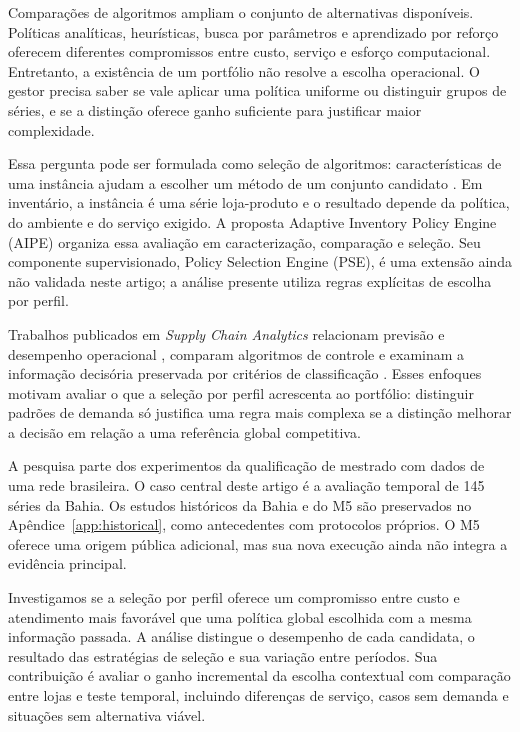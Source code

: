 \documentclass[preprint,12pt]{elsarticle}
\begin{document}
Comparações de algoritmos ampliam o conjunto de alternativas disponíveis. Políticas analíticas, heurísticas, busca por parâmetros e aprendizado por reforço oferecem diferentes compromissos entre custo, serviço e esforço computacional. Entretanto, a existência de um portfólio não resolve a escolha operacional. O gestor precisa saber se vale aplicar uma política uniforme ou distinguir grupos de séries, e se a distinção oferece ganho suficiente para justificar maior complexidade.

Essa pergunta pode ser formulada como seleção de algoritmos: características de uma instância ajudam a escolher um método de um conjunto candidato \cite{rice1976,Kotthoff2014AlgorithmSelection}. Em inventário, a instância é uma série loja-produto e o resultado depende da política, do ambiente e do serviço exigido. A proposta Adaptive Inventory Policy Engine (AIPE) organiza essa avaliação em caracterização, comparação e seleção. Seu componente supervisionado, Policy Selection Engine (PSE), é uma extensão ainda não validada neste artigo; a análise presente utiliza regras explícitas de escolha por perfil.

Trabalhos publicados em \textit{Supply Chain Analytics} relacionam previsão e desempenho operacional \cite{sca_f81ad2b3e023}, comparam algoritmos de controle \cite{sca_27e994c54848} e examinam a informação decisória preservada por critérios de classificação \cite{sca_c5c06dcbc9e5}. Esses enfoques motivam avaliar o que a seleção por perfil acrescenta ao portfólio: distinguir padrões de demanda só justifica uma regra mais complexa se a distinção melhorar a decisão em relação a uma referência global competitiva.

A pesquisa parte dos experimentos da qualificação de mestrado com dados de uma rede brasileira. O caso central deste artigo é a avaliação temporal de 145 séries da Bahia. Os estudos históricos da Bahia e do M5 são preservados no Apêndice~\ref{app:historical}, como antecedentes com protocolos próprios. O M5 oferece uma origem pública adicional, mas sua nova execução ainda não integra a evidência principal.

Investigamos se a seleção por perfil oferece um compromisso entre custo e atendimento mais favorável que uma política global escolhida com a mesma informação passada. A análise distingue o desempenho de cada candidata, o resultado das estratégias de seleção e sua variação entre períodos. Sua contribuição é avaliar o ganho incremental da escolha contextual com comparação entre lojas e teste temporal, incluindo diferenças de serviço, casos sem demanda e situações sem alternativa viável.
\end{document}

